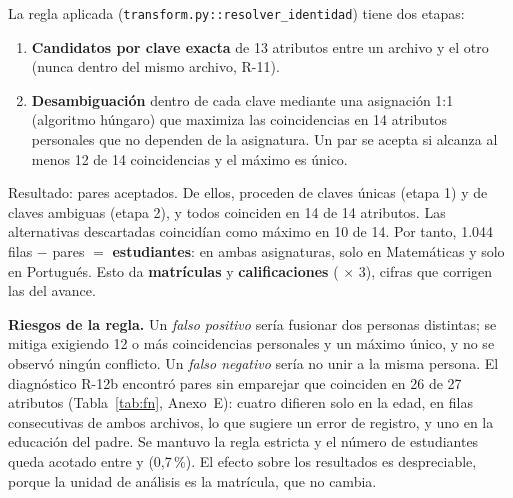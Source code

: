 \documentclass[11pt,a4paper]{article}
\begin{document}
La regla aplicada (\texttt{transform.py::resolver\_identidad}) tiene dos etapas:
\begin{enumerate}
\item \textbf{Candidatos por clave exacta} de 13 atributos entre un archivo y el otro (nunca dentro del mismo archivo, R-11).
\item \textbf{Desambiguación} dentro de cada clave mediante una asignación 1:1 (algoritmo húngaro)
que maximiza las coincidencias en 14 atributos personales que no dependen de la asignatura. Un par
se acepta si alcanza al menos 12 de 14 coincidencias y el máximo es único.
\end{enumerate}
Resultado: \nPares{} pares aceptados. De ellos, \nParesUno{} proceden de claves únicas (etapa 1) y
\nParesDos{} de claves ambiguas (etapa 2), y todos coinciden en 14 de 14 atributos. Las alternativas
descartadas coincidían como máximo en 10 de 14. Por tanto, 1.044 filas $-$ \nPares{} pares $=$
\textbf{\nEst{} estudiantes}: \nPares{} en ambas asignaturas, \nSoloMat{} solo en Matemáticas y
\nSoloPor{} solo en Portugués. Esto da \textbf{\nMat{} matrículas} y \textbf{\nCal{} calificaciones}
(\nMat{} $\times$ 3), cifras que corrigen las del avance.

\textbf{Riesgos de la regla.} Un \emph{falso positivo} sería fusionar dos personas distintas; se
mitiga exigiendo 12 o más coincidencias personales y un máximo único, y no se observó ningún
conflicto. Un \emph{falso negativo} sería no unir a la misma persona. El diagnóstico R-12b encontró
\nFalsosNeg{} pares sin emparejar que coinciden en 26 de 27 atributos (Tabla~\ref{tab:fn}, Anexo~E): cuatro difieren
solo en la edad, en filas consecutivas de ambos archivos, lo que sugiere un error de registro, y uno
en la educación del padre. Se mantuvo la regla estricta y el número de estudiantes queda acotado
entre \nEstMin{} y \nEst{} (0,7\,\%). El efecto sobre los resultados es despreciable, porque la
unidad de análisis es la matrícula, que no cambia.
\end{document}
